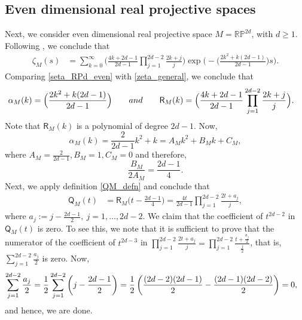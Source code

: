\documentclass[11pt,lettersize,reqno,fullpage]{amsart}
\begin{document}
\subsection{Even dimensional real projective spaces}
Next, we consider even dimensional real projective space $M=\mathbb{RP}^{2d}$, with $d\geq 1$.  
Following 
\cite[pages 8-9, corollary 3.4]{Cahn}, we conclude that 
\begin{align}
\zeta_{M}(s) & = \sum_{k=0}^{\infty} \Big(\frac{4k+2d-1}{2d-1}\prod_{j=1}^{2d-2} \frac{2k+j}{j}\Big) 
\exp\Big(-\Big(\frac{2k^2+k(2d-1)}{2d-1}\Big)s\Big). \label{seta_RPd_even}
\end{align}
Comparing \eqref{seta_RPd_even} with \eqref{zeta_general}, we conclude that 
\begin{align}
\alpha_{M}(k)& = \Big(\frac{2k^2+k(2d-1)}{2d-1}\Big) \qquad \textnormal{and} \qquad 
\mathsf{R}_{M}(k) = 
\Big(\frac{4k+2d-1}{2d-1}\prod_{j=1}^{2d-2} \frac{2k+j}{j}\Big).
\end{align}
Note that $\mathsf{R}_{M}(k)$ 
is a polynomial of degree $2d-1$.  Now, 
\[\alpha_{M}(k)=\frac{2}{2d-1}k^{2}+k=A_{M}k^{2}+B_{M}k+C_{M}, \]
where $A_{M}=\frac{2}{2d-1}, B_{M}=1, C_{M}=0 $ and therefore, 
\[\frac{B_{M}}{2 A_{M}}=\frac{2d-1}{4}. \] 
Next, we apply definition \eqref{QM_defn} and conclude that 
\begin{align}
\mathsf{Q}_{M}(t) & = \mathsf{R}_{M}\Big(t-\frac{2d-1}{4}\Big)=\frac{4t}{2d-1}  \prod_{j=1}^{2d-2} \frac{2t+a_{j}}{j} ,
\end{align}
where $a_{j}:=j-\frac{2d-1}{2},\ j=1,\dots,2d-2$. We claim that the coefficient of $t^{2d-2} $ in $\mathsf{Q}_{M}(t)$ is zero. 
To see this, we note that it is sufficient to prove that the numerator of the coefficient of $t^{2d-3} $ in $ \prod_{j=1}^{2d-2} \frac{2t+a_{j}}{j} =\prod_{j=1}^{2d-2} \frac{t+\frac{a_{j}}{2}}{\frac{j}{2}}$, that is, $\sum_{j=1}^{2d-2} \frac{a_{j}}{2} $ is zero. Now,
\begin{equation}
\begin{aligned}
\sum_{j=1}^{2d-2} \frac{a_{j}}{2}&=\frac{1}{2}\sum_{j=1}^{2d-2} \left(j-\frac{2d-1}{2} \right)=\frac{1}{2} \left(\frac{(2d-2)(2d-1)}{2}-\frac{(2d-1)(2d-2)}{2} \right)=0,
\end{aligned}
\notag
\end{equation}
and hence, we are done.
%
\end{document}
